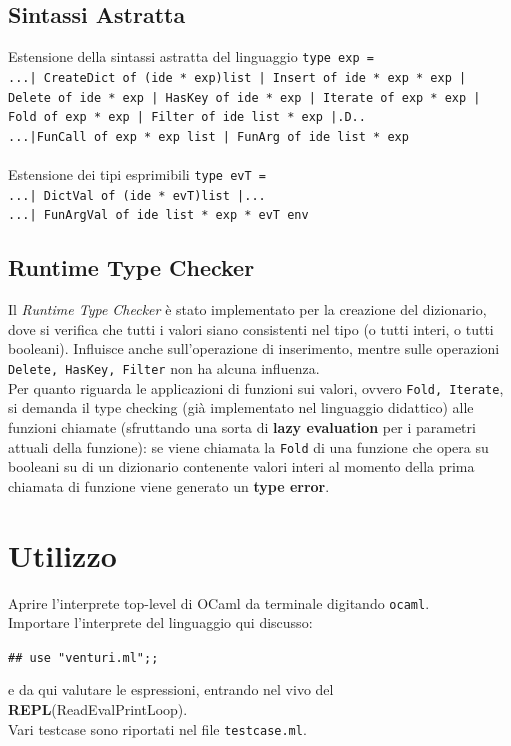 \documentclass[11pt, a4paper]{article}
\begin{document}
\subsection{Sintassi Astratta}
Estensione della sintassi astratta del linguaggio  \texttt{type exp = }\\
\texttt{...| CreateDict of (ide * exp)list | Insert of ide * exp * exp | Delete of  ide * exp | HasKey of ide * exp | Iterate of exp * exp	|
Fold of exp * exp | Filter of ide list * exp 	|.D..\\
...|FunCall of exp * exp list | FunArg of ide list * exp}\\\\
Estensione dei tipi esprimibili	\texttt{type evT = }\\
\texttt{...| DictVal of (ide * evT)list |...\\...| FunArgVal of ide list * exp * evT env }
\subsection{Runtime Type Checker}
Il \textit{Runtime Type Checker} è stato implementato per la creazione del dizionario, dove si verifica che tutti i valori siano consistenti nel tipo (o tutti interi, o tutti booleani). Influisce anche sull'operazione di inserimento, mentre sulle operazioni \texttt{Delete, HasKey, Filter} non ha alcuna influenza.\\ 
Per quanto riguarda le applicazioni di funzioni sui valori, ovvero \texttt{Fold, Iterate}, si demanda il type checking (già implementato nel linguaggio didattico) alle funzioni chiamate (sfruttando una sorta di \textbf{lazy evaluation} per i parametri attuali della funzione): se viene chiamata la \texttt{Fold} di una funzione che opera su booleani su di un dizionario contenente valori interi al momento della prima chiamata di funzione viene generato un \textbf{type error}.
\section{Utilizzo}
Aprire l'interprete top-level di OCaml da terminale digitando \texttt{ocaml}.\\ Importare l'interprete del linguaggio qui discusso:
\begin{center}
\texttt{\emph{\#}\# use "venturi.ml";;}
\end{center}
e da qui valutare le espressioni, entrando nel vivo del \textbf{REPL}(ReadEvalPrintLoop).\\Vari testcase sono riportati nel file \texttt{testcase.ml}. \clearpage
\end{document}
